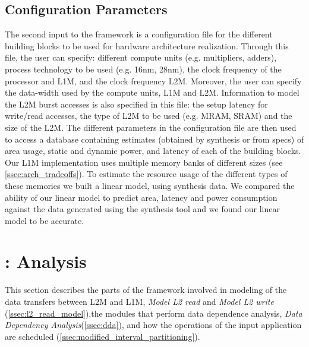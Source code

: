 \vspace{-1mm}
\subsection{Configuration Parameters}
\label{ssec:conf_param}
\vspace{-1mm}
The second input to the framework is a configuration file for the different building blocks to be used for hardware architecture realization. Through this file, the user can specify: different compute units (e.g. multipliers, adders), process technology to be used (e.g. 16nm, 28nm), the clock frequency of the processor and L1M, and the clock frequency L2M. Moreover, the user can specify the data-width used by the compute units, L1M and L2M.
Information to model the L2M burst accesses is also specified in this file: the setup latency for write/read accesses, the type of L2M to be used (e.g. MRAM, SRAM) and the size of the L2M. The different parameters in the configuration file are then used to access a database containing estimates (obtained by synthesis or from specs) of area usage, static and dynamic power, and latency of each of the building blocks. Our L1M implementation uses multiple memory banks of different sizes (see \ref{ssec:arch_tradeoffs}). To estimate the resource usage of the different types of these memories we built a linear model, using synthesis data. We compared the ability of our linear model to predict area, latency and power consumption against the data generated using the synthesis tool and we found our linear model to be accurate.

%

\section{\frameworkname: Analysis}
This section describes the parts of the framework involved in modeling of the data transfers between L2M and L1M, \textit{Model L2 read} and \textit{Model L2 write} (\ref{ssec:l2_read_model}),the modules that perform data dependence analysis, \textit{Data Dependency Analysis}(\ref{ssec:dda}), and how the operations of the input application are scheduled (\ref{ssec:modified_interval_partitioning}).
\vspace{-1mm}
